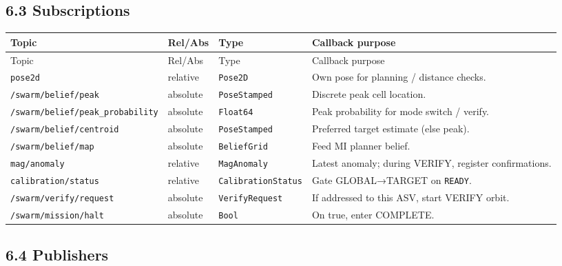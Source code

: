 \subsection{6.3 Subscriptions}


\begin{center}
\small
\begin{longtable}{@{}lllp{5.2cm}@{}}
\toprule
Topic & Rel/Abs & Type & Callback purpose \\
\midrule
\endfirsthead
\toprule
Topic & Rel/Abs & Type & Callback purpose \\
\midrule
\endhead
\texttt{pose2d} & relative & \texttt{Pose2D} & Own pose for planning / distance checks. \\
\texttt{/swarm/belief/peak} & absolute & \texttt{PoseStamped} & Discrete peak cell location. \\
\texttt{/swarm/belief/peak\_probability} & absolute & \texttt{Float64} & Peak probability for mode switch / verify. \\
\texttt{/swarm/belief/centroid} & absolute & \texttt{PoseStamped} & Preferred target estimate (else peak). \\
\texttt{/swarm/belief/map} & absolute & \texttt{BeliefGrid} & Feed MI planner belief. \\
\texttt{mag/anomaly} & relative & \texttt{MagAnomaly} & Latest anomaly; during VERIFY, register confirmations. \\
\texttt{calibration/status} & relative & \texttt{CalibrationStatus} & Gate GLOBAL→TARGET on \texttt{READY}. \\
\texttt{/swarm/verify/request} & absolute & \texttt{VerifyRequest} & If addressed to this ASV, start VERIFY orbit. \\
\texttt{/swarm/mission/halt} & absolute & \texttt{Bool} & On true, enter COMPLETE. \\
\bottomrule
\end{longtable}
\end{center}


\subsection{6.4 Publishers}


